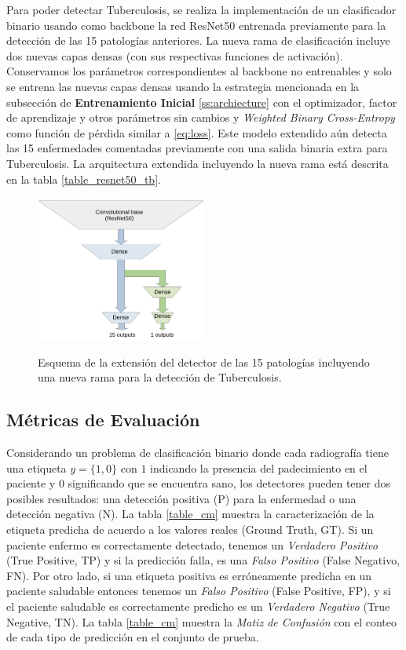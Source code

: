 {Para poder detectar Tuberculosis, se realiza la implementación de un clasificador binario usando como
backbone la red ResNet50 entrenada previamente para la detección de las 15 patologías anteriores.
La nueva rama de clasificación incluye dos nuevas capas densas (con sus respectivas funciones de
activación). Conservamos los parámetros correspondientes al backbone no entrenables y solo se entrena
las nuevas capas densas usando la estrategia mencionada en la subsección de {\bf Entrenamiento Inicial}
\ref{ss:archiecture} con el optimizador, factor de aprendizaje y otros parámetros sin cambios y
\textit{Weighted Binary Cross-Entropy} como función de pérdida similar a \eqref{eq:loss}. Este modelo
extendido aún detecta las 15 enfermedades comentadas previamente con una salida binaria extra para
Tuberculosis. La arquitectura extendida incluyendo la nueva rama está descrita en la tabla
\ref{table_resnet50_tb}.

\begin{figure}[htp]
    \centering
    {\includegraphics[width=0.5\textwidth]{Chapters/4. ViT-Lung/images/tb_net.pdf}}
\caption{ Esquema de la extensión del detector de las 15 patologías incluyendo una nueva rama para
          la detección de Tuberculosis.}
\label{net_tb}
\end{figure}


\subsection{Métricas de Evaluación} \label{sec_metrics}

Considerando un problema de clasificación binario donde cada radiografía tiene una etiqueta
$y = \{1, 0\}$ con $1$ indicando la presencia del padecimiento en el paciente y $0$ significando
que se encuentra sano, los detectores pueden tener dos posibles resultados: una detección positiva (P)
para la enfermedad o una detección negativa (N). La tabla \ref{table_cm} muestra la caracterización
de la etiqueta predicha de acuerdo a los valores reales (Ground Truth, GT). Si un paciente enfermo
es correctamente detectado, tenemos un \textit{Verdadero Positivo} (True Positive, TP) y si la
predicción falla, es una \textit{Falso Positivo} (False Negativo, FN). Por otro lado, si una etiqueta
positiva es erróneamente predicha en un paciente saludable entonces tenemos un \textit{Falso Positivo}
(False Positive, FP), y si el paciente saludable es correctamente predicho es un
\textit{Verdadero Negativo} (True Negative, TN). La tabla \ref{table_cm} muestra la \textit{Matiz de
Confusión} con el conteo de cada tipo de predicción en el conjunto de prueba.

}
